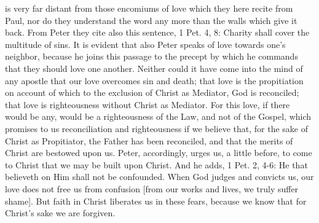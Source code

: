 is very far distant from those encomiums of love which they here
recite from Paul, nor do they understand the word any more than the
walls which give it back.  From Peter they cite also this sentence, 1
Pet. 4, 8: Charity shall cover the multitude of sins.  It is evident
that also Peter speaks of love towards one's neighbor, because he
joins this passage to the precept by which he commands that they
should love one another.  Neither could it have come into the mind of
any apostle that our love overcomes sin and death; that love is the
propitiation on account of which to the exclusion of Christ as
Mediator, God is reconciled; that love is righteousness without
Christ as Mediator.  For this love, if there would be any, would be a
righteousness of the Law, and not of the Gospel, which promises to us
reconciliation and righteousness if we believe that, for the sake of
Christ as Propitiator, the Father has been reconciled, and that the
merits of Christ are bestowed upon us.  Peter, accordingly, urges us,
a little before, to come to Christ that we may be built upon Christ.
And he adds, 1 Pet. 2, 4-6: He that believeth on Him shall not be
confounded.  When God judges and convicts us, our love does not free
us from confusion [from our works and lives, we truly suffer shame].
But faith in Christ liberates us in these fears, because we know that
for Christ's sake we are forgiven.

